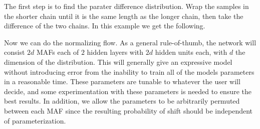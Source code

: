 The first step is to find the parater difference distribution. 
Wrap the samples in the shorter chain until it is the same length as the longer chain, then take the difference of the two chains. 
In this example we get the following.

Now we can do the normalizing flow. As a general rule-of-thumb, the network will consist $2d$ MAFs each of $2$ hidden layers with $2d$ hidden units each, with $d$ the dimension of the distribution.
This will generally give an expressive model without introducing error from the inability to train all of the models parameters in a reasonable time. 
These parameters are tunable to whatever the user will decide, and some experimentation with these parameters is needed to ensure the best results.
In addition, we allow the parameters to be arbitrarily permuted between each MAF since the resulting probability of shift should be independent of parameterization.

